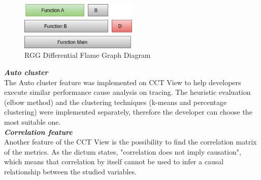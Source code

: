 \begin{figure}[h]
  \centering
    \includegraphics[width=0.5\textwidth]{figures/flame.jpg}
  \caption{RGG Differential Flame Graph Diagram}
  \label{fig:flame}
\end{figure}

\textbf{\textit{Auto cluster}}\\
The Auto cluster feature was implemented on CCT View to help developers execute similar performance cause analysis on tracing. The heuristic evaluation (elbow method) and the clustering techniques (k-means and percentage clustering) were implemented separately, therefore the developer can choose the most suitable one.\\
    
\textbf{\textit{Correlation feature}}\\
Another feature of the CCT View is the possibility to find the correlation matrix of the metrics. 
As the dictum states, "correlation does not imply causation", which means that correlation by itself cannot be used to infer a causal relationship between the studied variables.
    